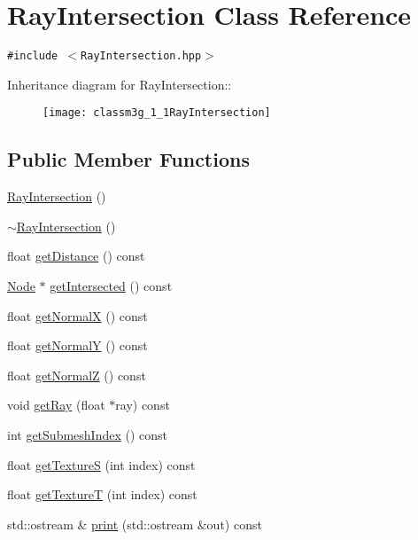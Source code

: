 \hypertarget{classm3g_1_1RayIntersection}{
\section{RayIntersection Class Reference}
\label{classm3g_1_1RayIntersection}
}
{\tt \#include $<$RayIntersection.hpp$>$}

Inheritance diagram for RayIntersection::\begin{figure}[H]
\begin{center}
\leavevmode
\texttt{[image: classm3g\_1\_1RayIntersection]}
\end{center}
\end{figure}
\subsection*{Public Member Functions}
\begin{CompactItemize}
\item 
\hyperlink{classm3g_1_1RayIntersection_242b33a79f98ed90ad5a36912d2a46d5}{RayIntersection} ()
\item 
\hyperlink{classm3g_1_1RayIntersection_bf9eb45cc9ff31acd542bb0da1b46fe1}{$\sim$RayIntersection} ()
\item 
float \hyperlink{classm3g_1_1RayIntersection_f024301f51d2ef67cac50e3255a49612}{getDistance} () const 
\item 
\hyperlink{classm3g_1_1Node}{Node} $\ast$ \hyperlink{classm3g_1_1RayIntersection_cbf90cea6001c33cc03b5a737b312f62}{getIntersected} () const 
\item 
float \hyperlink{classm3g_1_1RayIntersection_0ee7a8fab5e001b131bd3109da8af7fa}{getNormalX} () const 
\item 
float \hyperlink{classm3g_1_1RayIntersection_1e05e3b3e8d6b46462812e4713a63d18}{getNormalY} () const 
\item 
float \hyperlink{classm3g_1_1RayIntersection_5d0569741397401f53b776f16d08f5c3}{getNormalZ} () const 
\item 
void \hyperlink{classm3g_1_1RayIntersection_3f4d1f2f24c0dadab914014836e1b138}{getRay} (float $\ast$ray) const 
\item 
int \hyperlink{classm3g_1_1RayIntersection_6a11c61d1a1fecc01f2f83463404a6b8}{getSubmeshIndex} () const 
\item 
float \hyperlink{classm3g_1_1RayIntersection_bc14e1d5a83d5fca608b1fbf772614d4}{getTextureS} (int index) const 
\item 
float \hyperlink{classm3g_1_1RayIntersection_843d5b907bb54a6f28571f0a0f14c932}{getTextureT} (int index) const 
\item 
std::ostream \& \hyperlink{classm3g_1_1RayIntersection_6fea17fa1532df3794f8cb39cb4f911f}{print} (std::ostream \&out) const 
\end{CompactItemize}


